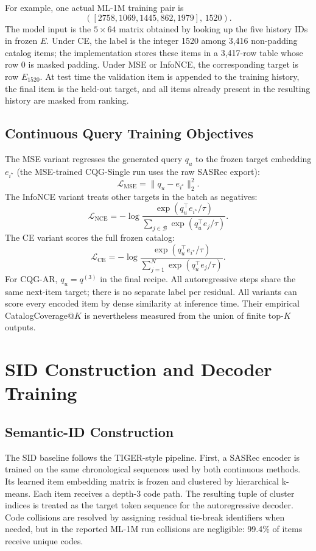 \documentclass[letterpaper]{article}
\begin{document}
For example, one actual ML-1M training pair is
\[
([2758,1069,1445,862,1979],\,1520).
\]
The model input is the \(5\times64\) matrix obtained by looking up the five
history IDs in frozen \(E\). Under CE, the label is the integer 1520 among
3,416 non-padding catalog items; the implementation stores these items in a
3,417-row table whose row 0 is masked padding. Under MSE or InfoNCE, the
corresponding target is row \(E_{1520}\). At test time the validation item is appended to the
training history, the final item is the held-out target, and all items already
present in the resulting history are masked from ranking.

\subsection{Continuous Query Training Objectives}
\label{app:cqg_losses}

The MSE variant regresses the generated query $q_u$ to the frozen target embedding $e_{i^\star}$ (the MSE-trained CQG-Single run uses the raw SASRec export):
\[
\mathcal{L}_{\mathrm{MSE}} =
\|q_u - e_{i^\star}\|_2^2.
\]
The InfoNCE variant treats other targets in the batch as negatives:
\[
\mathcal{L}_{\mathrm{NCE}} =
-\log
\frac{\exp(q_u^\top e_{i^\star}/\tau)}
{\sum_{j\in\mathcal{B}}\exp(q_u^\top e_j/\tau)}.
\]
The CE variant scores the full frozen catalog:
\[
\mathcal{L}_{\mathrm{CE}} =
-\log
\frac{\exp(q_u^\top e_{i^\star}/\tau)}
{\sum_{j=1}^{N}\exp(q_u^\top e_j/\tau)}.
\]
For CQG-AR, \(q_u=q^{(3)}\) in the final recipe.  All autoregressive steps
share the same next-item target; there is no separate label per residual.
All variants can score every encoded item by dense similarity at inference
time. Their empirical CatalogCoverage@$K$ is nevertheless measured from the
union of finite top-$K$ outputs.

\section{SID Construction and Decoder Training}
\label{app:sid}

\subsection{Semantic-ID Construction}
\label{app:sid_construction}

The SID baseline follows the TIGER-style pipeline. First, a SASRec encoder is trained on the same chronological sequences used by both continuous methods. Its learned item embedding matrix is frozen and clustered by hierarchical k-means. Each item receives a depth-3 code path. The resulting tuple of cluster indices is treated as the target token sequence for the autoregressive decoder. Code collisions are resolved by assigning residual tie-break identifiers when needed, but in the reported ML-1M run collisions are negligible: 99.4\% of items receive unique codes.
\end{document}
